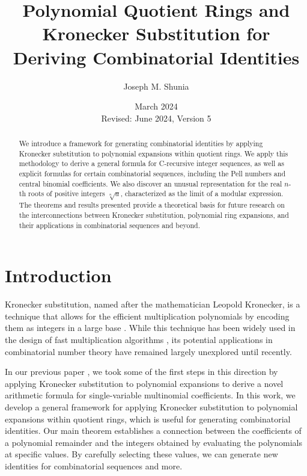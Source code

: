 \documentclass[12pt]{article}
\theoremstyle{plain}
\theoremstyle{definition}
\begin{document}
\title{Polynomial Quotient Rings and Kronecker Substitution for Deriving Combinatorial Identities}
\author{Joseph M. Shunia}
\date{March 2024 \\ \small Revised: June 2024, Version 5 \normalsize}

\maketitle

\begin{abstract}
We introduce a framework for generating combinatorial identities by applying Kronecker substitution to polynomial expansions within quotient rings. We apply this methodology to derive a general formula for C-recursive integer sequences, as well as explicit formulas for certain combinatorial sequences, including the Pell numbers and central binomial coefficients. We also discover an unusual representation for the real $n$-th roots of positive integers $\sqrt[n]{a}$, characterized as the limit of a modular expression. The theorems and results presented provide a theoretical basis for future research on the interconnections between Kronecker substitution, polynomial ring expansions, and their applications in combinatorial sequences and beyond.
\end{abstract}

\section{Introduction}
Kronecker substitution, named after the mathematician Leopold Kronecker, is a technique that allows for the efficient multiplication polynomials by encoding them as integers in a large base \cite{gathen2013modern}. While this technique has been widely used in the design of fast multiplication algorithms \cite{harvey2009kronecker, harvey2014faster, albrecht2018implementing, bos2020postquantum, greuet2022modular}, its potential applications in combinatorial number theory have remained largely unexplored until recently.

In our previous paper \cite{shunia2023simple}, we took some of the first steps in this direction by applying Kronecker substitution to polynomial expansions to derive a novel arithmetic formula for single-variable multinomial coefficients. In this work, we develop a general framework for applying Kronecker substitution to polynomial expansions within quotient rings, which is useful for generating combinatorial identities. Our main theorem establishes a connection between the coefficients of a polynomial remainder and the integers obtained by evaluating the polynomials at specific values. By carefully selecting these values, we can generate new identities for combinatorial sequences and more.
\end{document}
